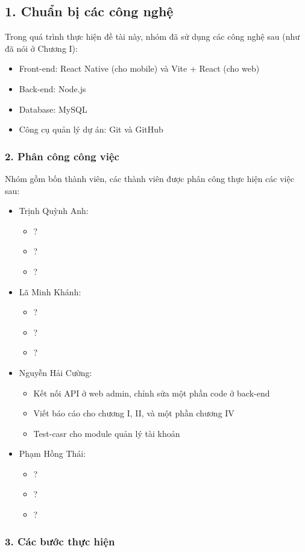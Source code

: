 \documentclass[../main.tex]{subfiles}
\begin{document}
\subsection*{1. Chuẩn bị các công nghệ}

Trong quá trình thực hiện đề tài này, nhóm đã sử dụng các công nghệ sau (như đã nói ở Chương I):

\begin{itemize}
    \item Front-end: React Native (cho mobile) và Vite + React (cho web)
    \item Back-end: Node.js
    \item Database: MySQL
    \item Công cụ quản lý dự án: Git và GitHub
\end{itemize}

\subsubsection*{2. Phân công công việc}
Nhóm gồm bốn thành viên, các thành viên được phân công thực hiện các việc sau:

\begin{itemize}
    \item Trịnh Quỳnh Anh:
    \begin{itemize}
        \item ?
        \item ?
        \item ?
    \end{itemize}
    \item Lã Minh Khánh:
    \begin{itemize}
        \item ?
        \item ?
        \item ?
    \end{itemize}
    \item Nguyễn Hải Cường:
    \begin{itemize}
        \item Kết nối API ở web admin, chỉnh sửa một phần code ở back-end
        \item Viết báo cáo cho chương I, II, và một phần chương IV
        \item Test-casr cho module quản lý tài khoản
    \end{itemize}
    \item Phạm Hồng Thái:
    \begin{itemize}
        \item ?
        \item ?
        \item ?
    \end{itemize}
\end{itemize}

\subsubsection*{3. Các bước thực hiện}
\end{document}
